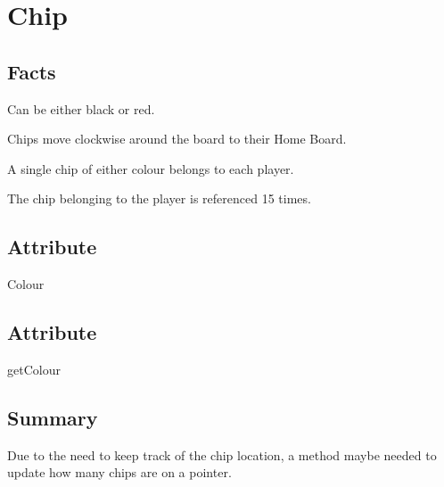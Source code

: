 \section{Chip}

\subsection{Facts}
\begin{dashed}
    \item Can be either black or red.
    \item Chips move clockwise around the board to their Home Board.
    \item A single chip of either colour belongs to each player.
    \item The chip belonging to the player is referenced 15 times.
\end{dashed}

\subsection{Attribute}
\begin{dashed}
    \item Colour
\end{dashed}

\subsection{Attribute}
\begin{dashed}
    \item getColour
\end{dashed}

\subsection{Summary}
Due to the need to keep track of the chip location, a method maybe needed to update how many chips
are on a pointer.

